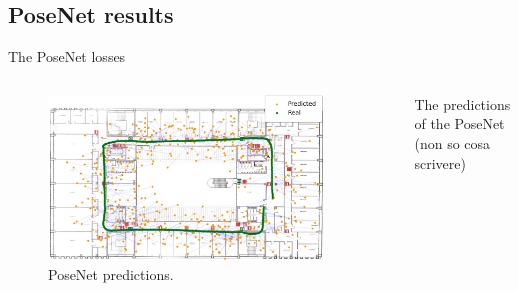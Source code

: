 \documentclass[
    center,
]{beamer}
\begin{document}
\subsection{PoseNet results}
\begin{frame}{The PoseNet losses}
    \begin{columns}
    \begin{figure}
        \centering
        \includegraphics[width=0.9\textwidth]{../imgs/posenet_map.png}
        \caption{PoseNet predictions.}
    \end{figure}

    The predictions of the PoseNet (non so cosa scrivere)
    \end{columns}
\end{frame}

\end{document}
